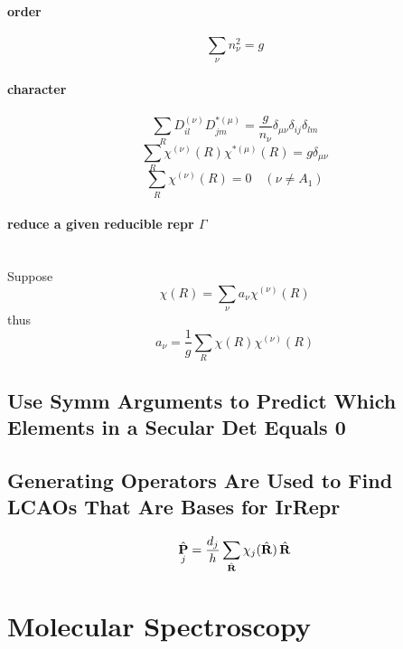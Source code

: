 \documentclass[a4paper]{article}
\DeclareMathOperator{\hP}{\hat{\vb{P}}}          %
\DeclareMathOperator{\hR}{\hat{\vb{R}}}
\numberwithin{equation}{section}
\begin{document}
\paragraph{order}
\begin{equation}\label{key}
\sum_\nu n_\nu^2 = g
\end{equation}
\paragraph{character}
\begin{equation}\label{key}
\sum_R D_{il}^{(\nu)} D_{jm}^{*(\mu)} = \dfrac{g}{n_\nu} \delta_{\mu\nu}\delta_{ij}\delta_{lm}
\end{equation}
\begin{equation}\label{key}
\sum_{R} \chi^{(\nu)}(R)\chi^{*(\mu)}(R) = g\delta_{\mu\nu}
\end{equation}
\begin{equation}\label{key}
\sum_R \chi^{(\nu)}(R) = 0 \quad (\nu \neq A_1)
\end{equation}
\paragraph{reduce a given reducible repr $ \Gamma $}~\\
Suppose
\begin{equation}\label{key}
\chi(R) = \sum_\nu a_\nu \chi^{(\nu)}(R)
\end{equation}
thus
\begin{equation}\label{key}
a_\nu = \dfrac{1}{g}\sum_R\chi(R)\chi^{(\nu)}(R)
\end{equation}

\subsection{Use Symm Arguments to Predict Which Elements in a Secular Det Equals 0}

\subsection{Generating Operators Are Used to Find LCAOs That Are Bases for IrRepr}
\begin{equation}\label{key}
\hP_j = \dfrac{d_j}{h}\sum_{\hR} \chi_j(\hR)\hR
\end{equation}

\section{Molecular Spectroscopy}
\end{document}
